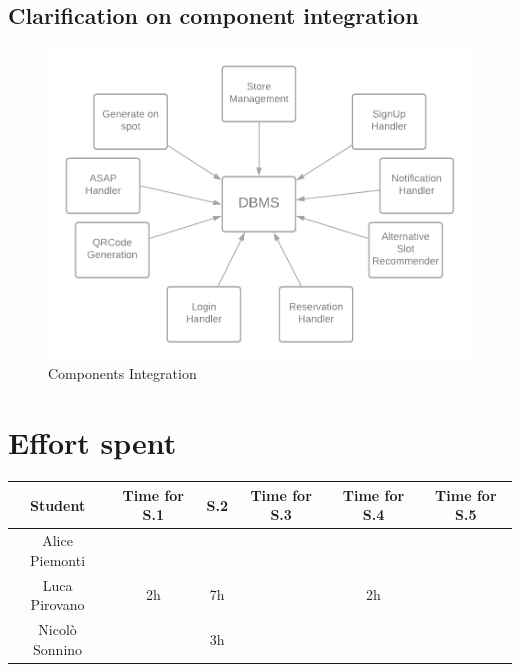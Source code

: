 \documentclass[table, 12pt]{article}
\begin{document}
\subsection{Clarification on component integration}
\begin{center}
    \begin{figure}[H]
        \includegraphics[width=\textwidth]{assets/ITPlan/Components-Integration.png}
        \caption{Components Integration}
        \label{components_integration}
    \end{figure}
\end{center}

\pagestyle{plain}

\section{Effort spent}
\begin{tabular}{ | c || c | c | c | c| c|}
    \hline
    Student        & Time for S.1 & S.2 & Time for S.3 & Time for S.4 & Time for S.5 \\ \hline
    Alice Piemonti &              &     &              &              &              \\ \hline
    Luca Pirovano  & 2h           & 7h  &              & 2h           &              \\ \hline
    Nicolò Sonnino &              & 3h  &              &              &              \\
    \hline
\end{tabular}
\end{document}
